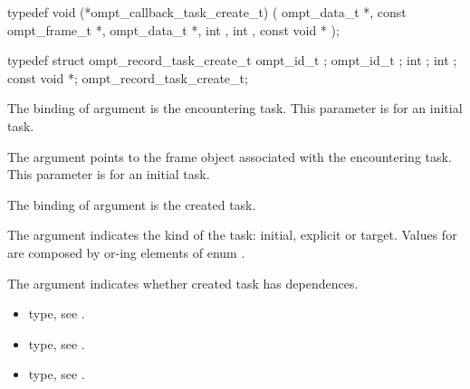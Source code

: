 \label{sec:ompt_callback_task_create_t}
\format

\begin{ccppspecific}
\begin{omptCallback}
typedef void (*ompt_callback_task_create_t) (
  ompt_data_t *,
  const ompt_frame_t *,
  ompt_data_t *,
  int ,
  int ,
  const void *
);
\end{omptCallback}
\end{ccppspecific}


\record

\begin{ccppspecific}
\begin{omptRecord}
typedef struct ompt_record_task_create_t {
  ompt_id_t ;
  ompt_id_t ;
  int ;
  int ;
  const void *;
} ompt_record_task_create_t;
\end{omptRecord}
\end{ccppspecific}


\argdesc

The binding of argument  is the
encountering task.  
This parameter is  for an initial task.

The argument  points to the frame object
associated with the encountering task. 
This parameter is  for an initial task.

The binding of argument  is the created
task.

The argument  indicates the kind of the task: initial,
explicit or target.
Values for  are composed by or-ing elements of enum
.

The argument  indicates whether created
task has dependences.

\codeptrdesc

\crossreferences
\begin{itemize}
\item {} type, see
.
\item {} type, see
.
\item {} type, see
.
\end{itemize}



